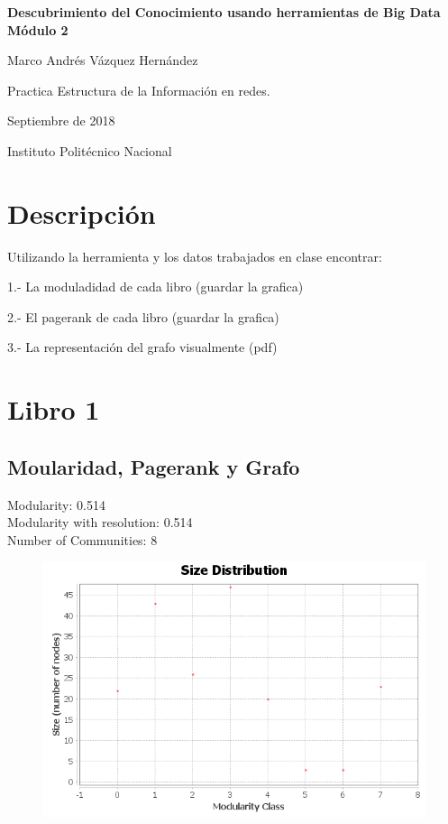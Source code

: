 \documentclass[]{article}
\title{}
\author{}
\date{}
\begin{document}
\begin{centering}

\vspace*{5 cm}

\Huge

{\bf Descubrimiento del Conocimiento usando herramientas de Big Data Módulo 2}

\vspace{3 cm}

\Large
Marco Andrés Vázquez Hernández

\vspace{1 cm}
\normalsize
Practica Estructura de la Información en redes. 

Septiembre de 2018

\normalsize
Instituto Politécnico Nacional


\end{centering}

\newpage

\section{Descripción}\label{descripcion}

Utilizando la herramienta y los datos trabajados en clase encontrar:

1.- La moduladidad de cada libro (guardar la grafica)

2.- El pagerank de cada libro (guardar la grafica)

3.- La representación del grafo visualmente (pdf)

\section{Libro 1}\label{libro-1}

\subsection{Moularidad, Pagerank y
Grafo}\label{moularidad-pagerank-y-grafo}

Modularity: 0.514\\
Modularity with resolution: 0.514\\
Number of Communities: 8

\begin{figure}[htbp]  
\centering
\includegraphics{modb1/communities-size-distribution.png}
\end{figure}
\end{document}
